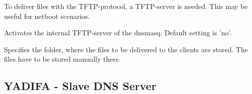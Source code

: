 To deliver files with the TFTP-protocol, a TFTP-server is needed. This may
be useful for netboot scenarios.

\begin{description}

    Activates the internal TFTP-server of the dnsmasq. Default setting is 'no'.


    Specifies the folder, where the files to be delivered to the
    clients are stored. The files have to be stored manually there.
\end{description}

\subsection {YADIFA - Slave DNS Server}


